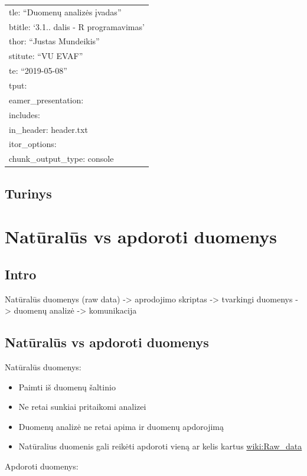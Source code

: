 \documentclass[]{article}
\title{}
\author{}
\date{}
\providecommand{\tightlist}{%
  \setlength{\itemsep}{0pt}\setlength{\parskip}{0pt}}
\begin{document}
\begin{longtable}[]{@{}l@{}}
\toprule
tle: ``Duomenų analizės įvadas''\tabularnewline
btitle: `3.1.. dalis - R programavimas'\tabularnewline
thor: ``Justas Mundeikis''\tabularnewline
stitute: ``VU EVAF''\tabularnewline
te: ``2019-05-08''\tabularnewline
tput:\tabularnewline
eamer\_presentation:\tabularnewline
includes:\tabularnewline
in\_header: header.txt\tabularnewline
itor\_options:\tabularnewline
chunk\_output\_type: console\tabularnewline
\bottomrule
\end{longtable}

\subsection{Turinys}\label{turinys}

\tableofcontents

\section{Natūralūs vs apdoroti
duomenys}\label{naturalus-vs-apdoroti-duomenys}

\subsection{Intro}\label{intro}

Natūralūs duomenys (raw data) -\textgreater{} aprodojimo skriptas
-\textgreater{} tvarkingi duomenys -\textgreater{} duomenų analizė
-\textgreater{} komunikacija

\subsection{Natūralūs vs apdoroti
duomenys}\label{naturalus-vs-apdoroti-duomenys-1}

Natūralūs duomenys:

\begin{itemize}
\tightlist
\item
  Paimti iš duomenų šaltinio
\item
  Ne retai sunkiai pritaikomi analizei
\item
  Duomenų analizė ne retai apima ir duomenų apdorojimą
\item
  Natūralius duomenis gali reikėti apdoroti vieną ar kelis kartus
  \href{https://en.wikipedia.org/wiki/Raw_data}{wiki:Raw\_data}
\end{itemize}

Apdoroti duomenys:
\end{document}
